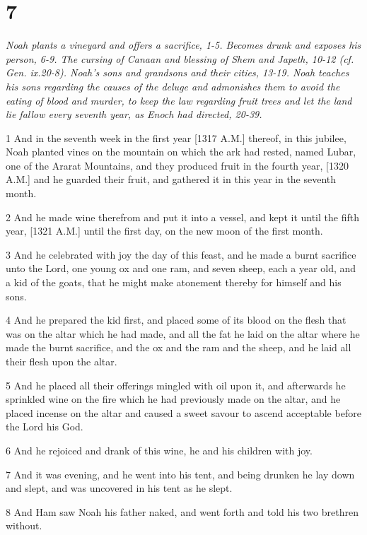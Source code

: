 \chapter{7}

\par \textit{Noah plants a vineyard and offers a sacrifice, 1-5. Becomes drunk and exposes his person, 6-9. The cursing of Canaan and blessing of Shem and Japeth, 10-12 (cf. Gen. ix.20-8). Noah's sons and grandsons and their cities, 13-19. Noah teaches his sons regarding the causes of the deluge and admonishes them to avoid the eating of blood and murder, to keep the law regarding fruit trees and let the land lie fallow every seventh year, as Enoch had directed, 20-39.}

\par 1 And in the seventh week in the first year [1317 A.M.] thereof, in this jubilee, Noah planted vines on the mountain on which the ark had rested, named Lubar, one of the Ararat Mountains, and they produced fruit in the fourth year, [1320 A.M.] and he guarded their fruit, and gathered it in this year in the seventh month.
\par 2 And he made wine therefrom and put it into a vessel, and kept it until the fifth year, [1321 A.M.] until the first day, on the new moon of the first month.
\par 3 And he celebrated with joy the day of this feast, and he made a burnt sacrifice unto the Lord, one young ox and one ram, and seven sheep, each a year old, and a kid of the goats, that he might make atonement thereby for himself and his sons.
\par 4 And he prepared the kid first, and placed some of its blood on the flesh that was on the altar which he had made, and all the fat he laid on the altar where he made the burnt sacrifice, and the ox and the ram and the sheep, and he laid all their flesh upon the altar.
\par 5 And he placed all their offerings mingled with oil upon it, and afterwards he sprinkled wine on the fire which he had previously made on the altar, and he placed incense on the altar and caused a sweet savour to ascend acceptable before the Lord his God.
\par 6 And he rejoiced and drank of this wine, he and his children with joy.
\par 7 And it was evening, and he went into his tent, and being drunken he lay down and slept, and was uncovered in his tent as he slept.
\par 8 And Ham saw Noah his father naked, and went forth and told his two brethren without.
